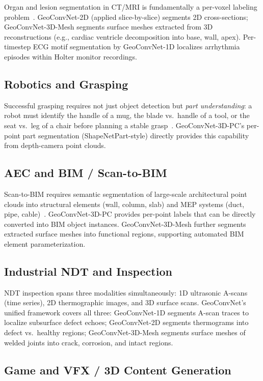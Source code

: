 \documentclass[10pt,conference]{IEEEtran}
\begin{document}
Organ and lesion segmentation in CT/MRI is fundamentally a per-voxel
labeling problem~\cite{litjens2017survey}.  GeoConvNet-2D (applied
slice-by-slice) segments 2D cross-sections; GeoConvNet-3D-Mesh segments
surface meshes extracted from 3D reconstructions (e.g., cardiac ventricle
decomposition into base, wall, apex).  Per-timestep ECG motif segmentation
by GeoConvNet-1D localizes arrhythmia episodes within Holter monitor
recordings.

\subsection{Robotics and Grasping}

Successful grasping requires not just object detection but \emph{part
understanding}: a robot must identify the handle of a mug, the blade vs.\
handle of a tool, or the seat vs.\ leg of a chair before planning a
stable grasp~\cite{qi2018frustum}.  GeoConvNet-3D-PC's per-point part
segmentation (ShapeNetPart-style) directly provides this capability from
depth-camera point clouds.

\subsection{AEC and BIM / Scan-to-BIM}

Scan-to-BIM requires semantic segmentation of large-scale architectural
point clouds into structural elements (wall, column, slab) and MEP
systems (duct, pipe, cable)~\cite{armeni2016semanticS3DIS}.  GeoConvNet-3D-PC
provides per-point labels that can be directly converted into BIM object
instances.  GeoConvNet-3D-Mesh further segments extracted surface meshes
into functional regions, supporting automated BIM element parameterization.

\subsection{Industrial NDT and Inspection}

NDT inspection spans three modalities simultaneously: 1D ultrasonic
A-scans (time series), 2D thermographic images, and 3D surface scans.
GeoConvNet's unified framework covers all three: GeoConvNet-1D segments
A-scan traces to localize subsurface defect echoes; GeoConvNet-2D
segments thermograms into defect vs.\ healthy regions; GeoConvNet-3D-Mesh
segments surface meshes of welded joints into crack, corrosion, and intact
regions.

\subsection{Game and VFX / 3D Content Generation}
\end{document}
